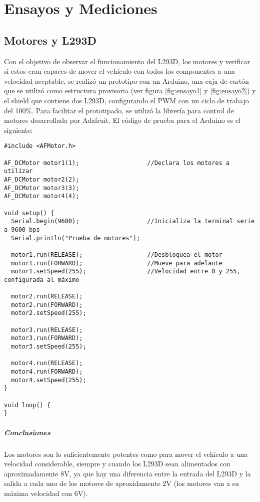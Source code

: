 \chapter{Ensayos y Mediciones}

\section{Motores y L293D}

Con el objetivo de observar el funcionamiento del L293D, los motores y
verificar si estos eran capaces de mover el vehículo con todos los
componentes a una velocidad aceptable, se realizó un prototipo con un Arduino, una caja de cartón que se utilizó 
como estructura provisoria (ver figura \ref{fig:ensayo1} y \ref{fig:ensayo2}) y el shield que contiene dos L293D, configurando el PWM con un ciclo de trabajo del 100\%. 
Para facilitar el prototipado, se utilizó la librería para control de motores desarrollada por Adafruit. El código de prueba para el Arduino es el siguiente:

\begin{lstlisting}
#include <AFMotor.h>

AF_DCMotor motor1(1);                   //Declara los motores a utilizar
AF_DCMotor motor2(2);
AF_DCMotor motor3(3);
AF_DCMotor motor4(4);

void setup() {
  Serial.begin(9600);                   //Inicializa la terminal serie a 9600 bps
  Serial.println("Prueba de motores");

  motor1.run(RELEASE);                  //Desbloquea el motor
  motor1.run(FORWARD);                  //Mueve para adelante
  motor1.setSpeed(255);                 //Velocidad entre 0 y 255, configurada al máximo

  motor2.run(RELEASE);
  motor2.run(FORWARD);
  motor2.setSpeed(255);

  motor3.run(RELEASE);
  motor3.run(FORWARD);
  motor3.setSpeed(255);

  motor4.run(RELEASE);
  motor4.run(FORWARD);
  motor4.setSpeed(255);
}

void loop() {
}
\end{lstlisting}

\paragraph{Conclusiones}

Los motores son lo suficientemente potentes como para mover el vehículo
a una velocidad considerable, siempre y cuando los L293D sean
alimentados con aproximadamente 8V, ya que hay una diferencia entre la
entrada del L293D y la salida a cada uno de los motores de
aproxidamente 2V (los motores van a su máxima velocidad con 6V).

